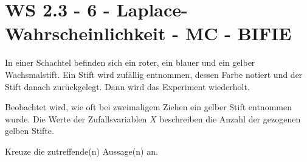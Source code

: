 \section{WS 2.3 - 6 - Laplace-Wahrscheinlichkeit - MC - BIFIE}

\begin{beispiel}[WS 2.3]{1}
In einer Schachtel befinden sich ein roter, ein blauer und ein gelber Wachsmalstift. Ein Stift wird zufällig entnommen, dessen Farbe notiert und der Stift danach zurückgelegt. Dann wird das
Experiment wiederholt.

Beobachtet wird, wie oft bei zweimaligem Ziehen ein gelber Stift entnommen wurde. Die Werte der Zufallsvariablen $X$ beschreiben die Anzahl der gezogenen gelben Stifte.

Kreuze die zutreffende(n) Aussage(n) an.

\end{beispiel}
